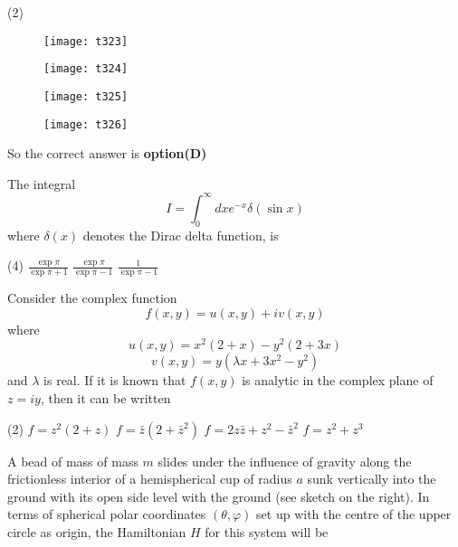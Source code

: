 \begin{questions}
\begin{minipage}{\textwidth}
\end{minipage}
\begin{tasks}(2)
	\task[\textbf{A.}] \begin{figure}[H]
		\centering
		\texttt{[image: t323]}
	\end{figure}
	\task[\textbf{B.}] \begin{figure}[H]
		\centering
		\texttt{[image: t324]}
	\end{figure}
	\task[\textbf{C.}] \begin{figure}[H]
		\centering
		\texttt{[image: t325]}
	\end{figure}
	\task[\textbf{D.}] \begin{figure}[H]
		\centering
		\texttt{[image: t326]}
	\end{figure}
\end{tasks}
\begin{answer}
	So the correct answer is \textbf{option(D)}
\end{answer}
\begin{minipage}{\textwidth}
	\question The integral
	$$
	I=\int_{0}^{\infty} d x e^{-x} \delta(\sin x)
	$$
	where $\delta(x)$ denotes the Dirac delta function, is
\end{minipage}
\begin{tasks}(4)
	\task[\textbf{B.}] $\frac{\exp \pi}{\exp \pi+1}$
	\task[\textbf{C.}] $\frac{\exp \pi}{\exp \pi-1}$
	\task[\textbf{D.}] $\frac{1}{\exp \pi-1}$
\end{tasks}
\begin{minipage}{\textwidth}
	\question Consider the complex function
	$$
	f(x, y)=u(x, y)+i v(x, y)
	$$
	where
	$$
	u(x, y)=x^{2}(2+x)-y^{2}(2+3 x)
	$$
	$$
	v(x, y)=y\left(\lambda x+3 x^{2}-y^{2}\right)
	$$
	and $\lambda$ is real. If it is known that $f(x, y)$ is analytic in the complex plane of $z=i y$, then it can be written
\end{minipage}
\begin{tasks}(2)
	\task[\textbf{A.}] $f=z^{2}(2+z)$
	\task[\textbf{B.}] $f=\bar{z}\left(2+\bar{z}^{2}\right)$
	\task[\textbf{C.}]   $f=2 z \bar{z}+z^{2}-\bar{z}^{2}$
	\task[\textbf{D.}] $f=z^{2}+z^{3}$
\end{tasks}
\begin{minipage}{\textwidth}
	\question A bead of mass of mass $m$ slides under the influence of gravity along the frictionless interior of a hemispherical cup of radius $a$ sunk vertically into the ground with its open side level with the ground (see sketch on the right). In terms of spherical polar coordinates $(\theta, \varphi)$ set up with the centre of the upper circle as origin, the Hamiltonian $H$ for this system will be

\end{minipage}
\end{questions}
